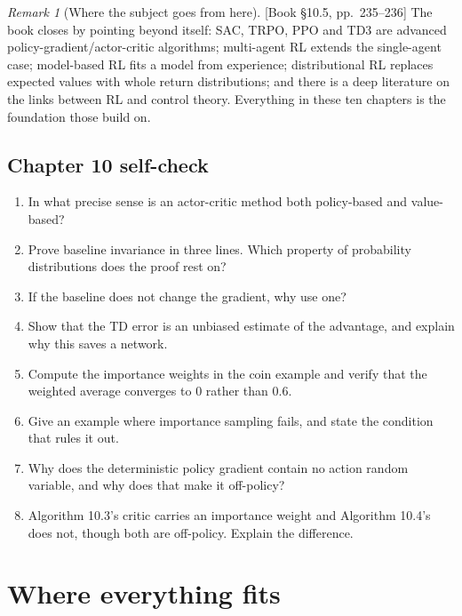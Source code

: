 \documentclass[11pt, letterpaper]{article}
\theoremstyle{runin}
\theoremstyle{runinplain}
\theoremstyle{remark}
\newtheorem*{remark}{Remark}
\newcommand{\bkin}[1]{{\color{bookblue}\small[\textsf{Book #1}]}}
\begin{document}
\begin{remark}[Where the subject goes from here]
\bkin{\S10.5, pp.~235--236} The book closes by pointing beyond itself: SAC, TRPO,
PPO and TD3 are advanced policy-gradient/actor-critic algorithms; multi-agent RL
extends the single-agent case; model-based RL fits a model from experience;
distributional RL replaces expected values with whole return distributions; and
there is a deep literature on the links between RL and control theory. Everything in
these ten chapters is the foundation those build on.
\end{remark}

\subsection{Chapter 10 self-check}

\begin{enumerate}
  \item In what precise sense is an actor-critic method both policy-based and
        value-based?
  \item Prove baseline invariance in three lines. Which property of probability
        distributions does the proof rest on?
  \item If the baseline does not change the gradient, why use one?
  \item Show that the TD error is an unbiased estimate of the advantage, and explain
        why this saves a network.
  \item Compute the importance weights in the coin example and verify that the
        weighted average converges to $0$ rather than $0.6$.
  \item Give an example where importance sampling fails, and state the condition that
        rules it out.
  \item Why does the deterministic policy gradient contain no action random variable,
        and why does that make it off-policy?
  \item Algorithm 10.3's critic carries an importance weight and Algorithm 10.4's does
        not, though both are off-policy. Explain the difference.
\end{enumerate}

\newpage

\section*{Where everything fits}
\end{document}
